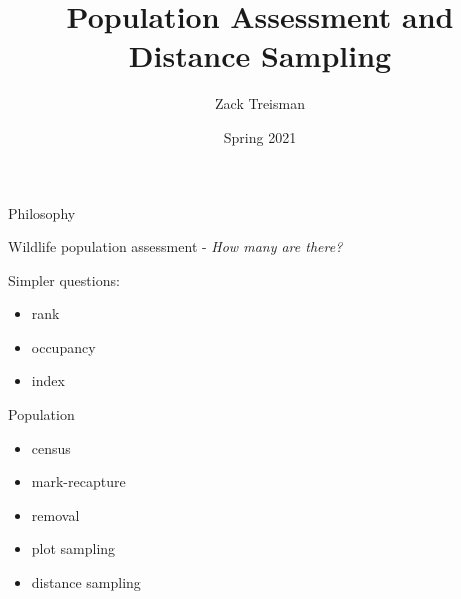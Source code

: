 \documentclass[
  ignorenonframetext,
]{beamer}
\title{Population Assessment and Distance Sampling}
\author{Zack Treisman}
\date{Spring 2021}
\providecommand{\tightlist}{%
  \setlength{\itemsep}{0pt}\setlength{\parskip}{0pt}}
\begin{document}
\frame{\titlepage}

\begin{frame}{Philosophy}
\protect\hypertarget{philosophy}{}

Wildlife population assessment - \emph{How many are there?}

\end{frame}

\begin{frame}{Simpler questions:}
\protect\hypertarget{simpler-questions}{}

\begin{itemize}
\tightlist
\item
  rank
\item
  occupancy
\item
  index
\end{itemize}

\end{frame}

\begin{frame}{Population}
\protect\hypertarget{population}{}

\begin{itemize}
\tightlist
\item
  census
\item
  mark-recapture
\item
  removal
\item
  plot sampling
\item
  distance sampling
\end{itemize}

\end{frame}
\end{document}
